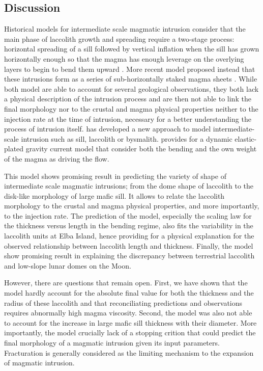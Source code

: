 \subsection{Discussion}
\label{sec:discussion-1}

Historical models  for intermediate scale magmatic  intrusion consider
that  the main  phase  of  laccolith growth  and  spreading require  a
two-stage process: horizontal spreading of a sill followed by vertical
inflation  when the  sill has  grown horizontally  enough so  that the
magma has  enough leverage on  the overlying  layers to begin  to bend
them  upward  \citep{Johnson:1973ho,Koch:1981if}.  More  recent  model
proposed  instead   that  these  intrusions   form  as  a   series  of
sub-horizontally            staked             magma            sheets
\citep{Morgan:2008hj,Menand:2011ki}.   While both  model  are able  to
account for several geological observations, they both lack a physical
description of the intrusion process and are then not able to link the
final  morphology nor  to the  crustal and  magma physical  properties
neither to the injection rate at  the time of intrusion, necessary for
a   better   understanding   the    process   of   intrusion   itself.
\citet{Michaut:2011kg}  has   developed  a   new  approach   to  model
intermediate-scale  intrusion such  as sill,  laccolith or  bysmalith.
\citet{Michaut:2011kg} provides  for a dynamic  elastic-plated gravity
current model that consider both the bending and the own weight of the
magma as driving the flow.

This model shows  promising result in predicting the  variety of shape
of  intermediate scale  magmatic intrusions;  from the  dome shape  of
laccolith to the disk-like morphology  of large mafic sill.  It allows
to relate the  laccolith morphology to the crustal  and magma physical
properties,  and  more  importantly,   to  the  injection  rate.   The
prediction of the model, especially  the scaling law for the thickness
versus length in the bending regime,  also fits the variability in the
laccolith  units  at  Elba  Island, hence  providing  for  a  physical
explanation for the observed relationship between laccolith length and
thickness. Finally, the model show  promising result in explaining the
discrepancy between terrestrial laccolith and low-slope lunar domes on
the Moon.

However, there  are questions that  remain open. First, we  have shown
that the  model hardly account for  the absolute final value  for both
the   thickness  and   the  radius   of  these   laccolith  and   that
reconciliating predictions  and observations requires  abnormally high
magma viscosity.  Second,  the model was also not able  to account for
the increase in  large mafic sill thickness with  their diameter. More
importantly, the model crucially lack of a stopping crition that could
predict the final  morphology of a magmatic intrusion  given its input
parameters.   Fracturation is  generally  considered  as the  limiting
mechanism to the expansion of magmatic intrusion.

